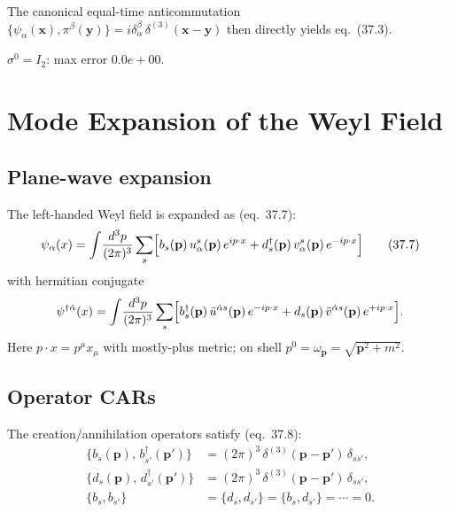 \documentclass[12pt]{article}
\newcommand{\verified}[1]{\textcolor{verifygreen}{\checkmark\; #1}}
\begin{document}
The canonical equal-time anticommutation $\{\psi_\alpha(\mathbf{x}),\pi^\beta(\mathbf{y})\}
= i\delta_\alpha^\beta\,\delta^{(3)}(\mathbf{x}-\mathbf{y})$ then directly yields eq.~(37.3).

\medskip
\verified{$\sigma^0 = I_2$: max error $0.0e+00$.}

\section{Mode Expansion of the Weyl Field}

\subsection{Plane-wave expansion}

The left-handed Weyl field is expanded as (eq.~37.7):
\begin{equation}
  \psi_\alpha(x) = \int\!\frac{d^3p}{(2\pi)^3}\sum_s
  \Bigl[b_s(\mathbf{p})\,u^s_\alpha(\mathbf{p})\,e^{ip\cdot x}
       +d^\dagger_s(\mathbf{p})\,v^s_\alpha(\mathbf{p})\,e^{-ip\cdot x}\Bigr]
  \tag{37.7}
\end{equation}
with hermitian conjugate
\begin{equation}
  \psi^{\dagger\dot\alpha}(x) = \int\!\frac{d^3p}{(2\pi)^3}\sum_s
  \Bigl[b^\dagger_s(\mathbf{p})\,\tilde u^{\dot\alpha s}(\mathbf{p})\,e^{-ip\cdot x}
       +d_s(\mathbf{p})\,\tilde v^{\dot\alpha s}(\mathbf{p})\,e^{+ip\cdot x}\Bigr].
\end{equation}
Here $p\cdot x = p^\mu x_\mu$ with mostly-plus metric; on shell $p^0 = \omega_{\mathbf{p}} = \sqrt{\mathbf{p}^2+m^2}$.

\subsection{Operator CARs}

The creation/annihilation operators satisfy (eq.~37.8):
\begin{align}
  \{b_s(\mathbf{p}),\,b^\dagger_{s'}(\mathbf{p}')\}
  &= (2\pi)^3\,\delta^{(3)}(\mathbf{p}-\mathbf{p}')\,\delta_{ss'},
  \tag{37.8a}\\
  \{d_s(\mathbf{p}),\,d^\dagger_{s'}(\mathbf{p}')\}
  &= (2\pi)^3\,\delta^{(3)}(\mathbf{p}-\mathbf{p}')\,\delta_{ss'},
  \tag{37.8b}\\
  \{b_s,b_{s'}\} &= \{d_s,d_{s'}\} = \{b_s,d_{s'}\} = \cdots = 0.
  \tag{37.8c}
\end{align}
\end{document}
